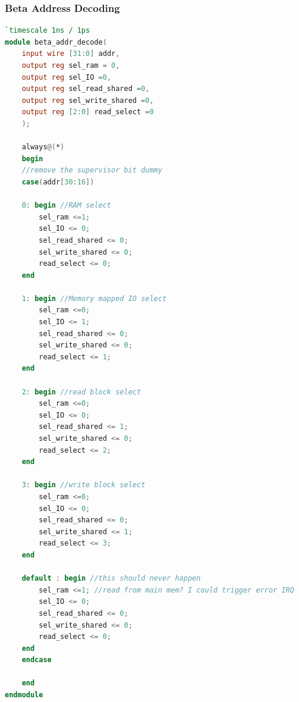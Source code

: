 \documentclass{article}
\begin{document}
\subsubsection{Beta Address Decoding}
\begin{lstlisting}[language=Verilog]
`timescale 1ns / 1ps
module beta_addr_decode(
	input wire [31:0] addr,
	output reg sel_ram = 0,
	output reg sel_IO =0,
	output reg sel_read_shared =0,
	output reg sel_write_shared =0,
	output reg [2:0] read_select =0
    );

	always@(*)
	begin
	//remove the supervisor bit dummy
	case(addr[30:16])
	
	0: begin //RAM select
		sel_ram <=1; 
		sel_IO <= 0;
		sel_read_shared <= 0;
		sel_write_shared <= 0;
		read_select <= 0;
	end
	
	1: begin //Memory mapped IO select 
		sel_ram <=0; 
		sel_IO <= 1;
		sel_read_shared <= 0;
		sel_write_shared <= 0;
		read_select <= 1;
	end
	
	2: begin //read block select
		sel_ram <=0; 
		sel_IO <= 0;
		sel_read_shared <= 1;
		sel_write_shared <= 0;
		read_select <= 2;
	end
	
	3: begin //write block select 
		sel_ram <=0; 
		sel_IO <= 0;
		sel_read_shared <= 0;
		sel_write_shared <= 1;
		read_select <= 3;
	end
	
	default : begin //this should never happen
		sel_ram <=1; //read from main mem? I could trigger error IRQ
		sel_IO <= 0;
		sel_read_shared <= 0;
		sel_write_shared <= 0;
		read_select <= 0;
	end 
	endcase
	
	end
endmodule
\end{lstlisting}
\end{document}
